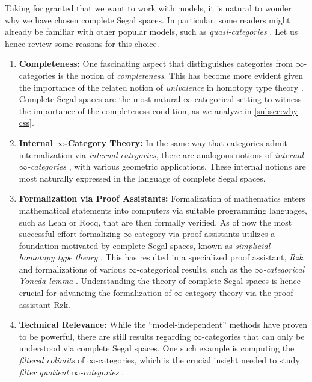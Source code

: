 \documentclass[11pt, a4paper]{amsart}
\theoremstyle{definition}
\theoremstyle{remark}
\numberwithin{equation}{section}
\begin{document}
Taking for granted that we want to work with models, it is natural to wonder why we have chosen complete Segal spaces. In particular, some readers might already be familiar with other popular models, such as \emph{quasi-categories} \cite{joyal2008notes,joyal2008theory,lurie2009htt}. Let us hence review some reasons for this choice.
\begin{enumerate}[leftmargin=*]
  \item \textbf{Completeness:} One fascinating aspect that distinguishes categories from $\infty$-categories is the notion of \emph{completeness}. This has become more evident given the importance of the related notion of \emph{univalence} in homotopy type theory \cite{hottbook2013}. Complete Segal spaces are the most natural $\infty$-categorical setting to witness the importance of the completeness condition, as we analyze in \cref{subsec:why css}.
  \item \textbf{Internal $\infty$-Category Theory:} In the same way that categories admit internalization via \emph{internal categories}, there are analogous notions of \emph{internal $\infty$-categories} \cite{rasekh2022cartesian}, with various geometric applications. These internal notions are most naturally expressed in the language of complete Segal spaces.
  \item \textbf{Formalization via Proof Assistants:} Formalization of mathematics enters mathematical statements into computers via suitable programming languages, such as Lean or Rocq, that are then formally verified. As of now the most successful effort formalizing $\infty$-category via proof assistants utilizes a foundation motivated by complete Segal spaces, known as \emph{simplicial homotopy type theory} \cite{riehlshulman2017rezktypes}. This has resulted in a specialized proof assistant, \emph{Rzk}, and formalizations of various $\infty$-categorical results, such as the \emph{$\infty$-categorical Yoneda lemma} \cite{kudasovriehlweinberger2024rzkyoneda}. Understanding the theory of complete Segal spaces is hence crucial for advancing the formalization of $\infty$-category theory via the proof assistant Rzk.
  \item \textbf{Technical Relevance:} While the ``model-independent'' methods have proven to be powerful, there are still results regarding $\infty$-categories that can only be understood via complete Segal spaces. One such example is computing the \emph{filtered colimits} of $\infty$-categories, which is the crucial insight needed to study \emph{filter quotient $\infty$-categories} \cite{rasekh2021filterquotient}.

\end{enumerate}
\end{document}
